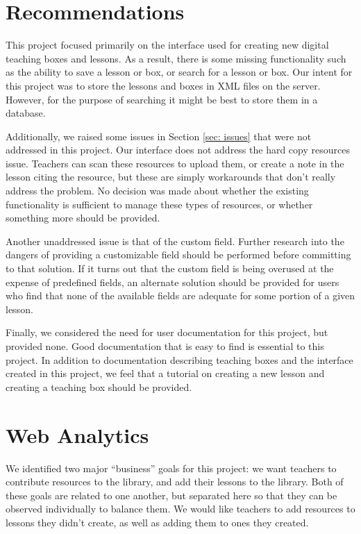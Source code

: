 \documentclass[10pt,letter]{article}
\begin{document}
\section{Recommendations}
This project focused primarily on the interface used for creating new digital
teaching boxes and lessons. As a result, there is some missing functionality
such as the ability to save a lesson or box, or search for a lesson or box. Our
intent for this project was to store the lessons and boxes in XML files on the
server. However, for the purpose of searching it might be best to store them in
a database.

Additionally, we raised some issues in Section \ref{sec: issues} that were not
addressed in this project. Our interface does not address the hard copy
resources issue. Teachers can scan these resources to upload them, or create a
note in the lesson citing the resource, but these are simply workarounds that
don't really address the problem. No decision was made about whether the
existing functionality is sufficient to manage these types of resources, or
whether something more should be provided.

Another unaddressed issue is that of the custom field. Further research into the
dangers of providing a customizable field should be performed before committing
to that solution. If it turns out that the custom field is being overused at the
expense of predefined fields, an alternate solution should be provided for users
who find that none of the available fields are adequate for some portion of a
given lesson.

Finally, we considered the need for user documentation for this project, but
provided none. Good documentation that is easy to find is essential to this
project. In addition to documentation describing teaching boxes and the
interface created in this project, we feel that a tutorial on creating a new
lesson and creating a teaching box should be provided.

\section{Web Analytics}
We identified two major ``business'' goals for this project: we want teachers to
contribute resources to the library, and add their lessons to the library. Both
of these goals are related to one another, but separated here so that they can
be observed individually to balance them. We would like teachers to add
resources to lessons they didn't create, as well as adding them to ones they
created.
\end{document}
